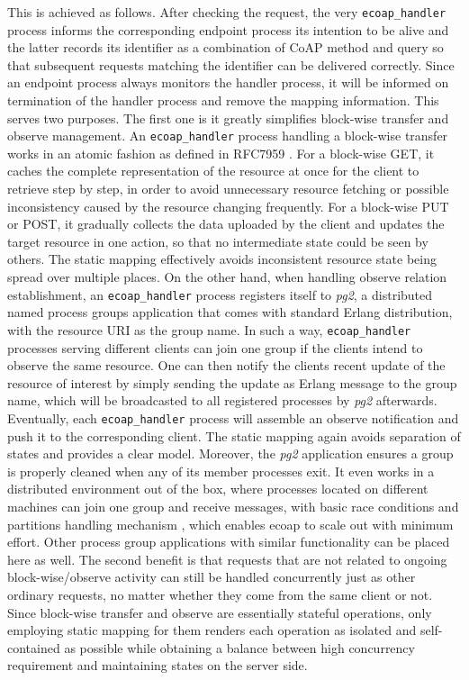 This is achieved as follows. After checking the request, the very \verb|ecoap_handler| process informs the corresponding endpoint process its intention to be alive and the latter records its identifier as a combination of CoAP method and query so that subsequent requests matching the identifier can be delivered correctly. Since an endpoint process always monitors the handler process, it will be informed on termination of the handler process and remove the mapping information. This serves two purposes. The first one is it greatly simplifies block-wise transfer and observe management. An \verb|ecoap_handler| process handling a block-wise transfer works in an atomic fashion as defined in RFC7959 \autocite{blockwise}. For a block-wise GET, it caches the complete representation of the resource at once for the client to retrieve step by step, in order to avoid unnecessary resource fetching or possible inconsistency caused by the resource changing frequently. For a block-wise PUT or POST,  it gradually collects the data uploaded by the client and updates the target resource in one action, so that no intermediate state could be seen by others. The static mapping effectively avoids inconsistent resource state being spread over multiple places. On the other hand, when handling observe relation establishment, an \verb|ecoap_handler| process registers itself to \textit{pg2}, a distributed named process groups application that comes with standard Erlang distribution, with the resource URI as the group name. In such a way, \verb|ecoap_handler| processes serving different clients can join one group if the clients intend to observe the same resource. One can then notify the clients recent update of the resource of interest by simply sending the update as Erlang message to the group name, which will be broadcasted to all registered processes by \textit{pg2} afterwards. Eventually, each \verb|ecoap_handler| process will assemble an observe notification and push it to the corresponding client. The static mapping again avoids separation of states and provides a clear model. Moreover, the \textit{pg2} application ensures a group is properly cleaned when any of its member processes exit. It even works in a distributed environment out of the box, where processes located on different machines can join one group and receive messages, with basic race conditions and partitions handling mechanism \autocite{pg2_failure}, which enables ecoap to scale out with minimum effort. Other process group applications with similar functionality can be placed here as well. The second benefit is that requests that are not related to ongoing block-wise/observe activity can still be handled concurrently just as other ordinary requests, no matter whether they come from the same client or not. Since block-wise transfer and observe are essentially stateful operations, only employing static mapping for them renders each operation as isolated and self-contained as possible while obtaining a balance between high concurrency requirement and maintaining states on the server side.

